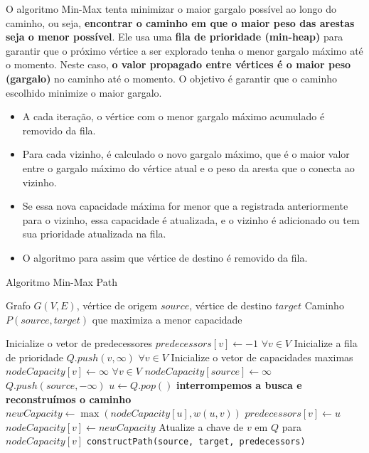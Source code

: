 \documentclass[12pt]{article}
\begin{document}
O algoritmo Min-Max tenta minimizar o maior gargalo possível ao longo do caminho, ou seja, \textbf{encontrar o caminho em que o maior peso das arestas seja o menor possível}. Ele usa uma \textbf{fila de prioridade (min-heap)} para garantir que o próximo vértice a ser explorado tenha o menor gargalo máximo até o momento. Neste caso, \textbf{o valor propagado entre vértices é o maior peso (gargalo)} no caminho até o momento. O objetivo é garantir que o caminho escolhido minimize o maior gargalo.

\begin{itemize}
    \item A cada iteração, o vértice com o menor gargalo máximo acumulado é removido da fila.
    \item Para cada vizinho, é calculado o novo gargalo máximo, que é o maior valor entre o gargalo máximo do vértice atual e o peso da aresta que o conecta ao vizinho.
    \item Se essa nova capacidade máxima for menor que a registrada anteriormente para o vizinho, essa capacidade é atualizada, e o vizinho é adicionado ou tem sua prioridade atualizada na fila.
    \item O algoritmo para assim que vértice de destino é removido da fila.
\end{itemize}

\begin{algorithm}
\caption{Algoritmo Min-Max Path}
\begin{algorithmic}[1]
\REQUIRE Grafo \( G(V, E) \), vértice de origem \( source \), vértice de destino \( target \)
\ENSURE Caminho \( P(source, target) \) que maximiza a menor capacidade

\STATE Inicialize o vetor de predecessores \( predecessors[v] \leftarrow -1 \) \(\forall v \in V\)
\STATE Inicialize a fila de prioridade \( Q.push(v, \infty ) \) \(\forall v \in V\)
\STATE Inicialize o vetor de capacidades maximas \( nodeCapacity[v] \leftarrow \infty\) \(\forall v \in V\)
\STATE \( nodeCapacity[source] \leftarrow \infty \)
\STATE \( Q.push(source, -\infty) \)
    \STATE \( u \leftarrow Q.pop() \) 
        \STATE \textbf{interrompemos a busca e reconstruímos o caminho}
    \ENDIF
        \STATE \( newCapacity \leftarrow \max(nodeCapacity[u], w(u, v)) \)
            \STATE \( predecessors[v] \leftarrow u \)
            \STATE \( nodeCapacity[v] \leftarrow newCapacity \)
            \STATE Atualize a chave de \( v \) em \( Q \) para \( nodeCapacity[v] \)
        \ENDIF
    \ENDFOR
\ENDWHILE
\RETURN \texttt{constructPath(source, target, predecessors)}
\end{algorithmic}
\end{algorithm}
\end{document}
